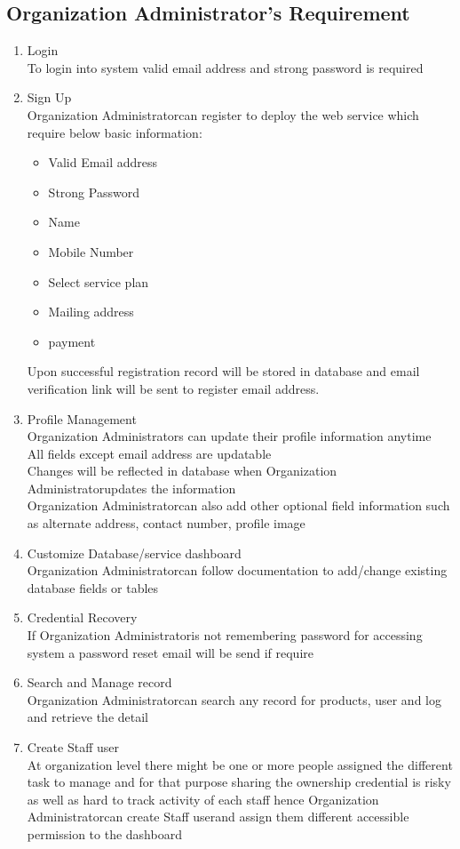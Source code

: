 \documentclass{scrreprt}
\newcommand*\arrow{\item[$\Rightarrow$]}
\def\admin{Organization Administrator}
\def\staff{Staff user}
\begin{document}
\subsection{\admin's Requirement}
\begin{enumerate}[start=1,label={\bfseries REQ \arabic*:}]
	\addtolength{\itemindent}{40pt}
	\item Login
		\\To login into system valid email address and strong password is required
	\item Sign Up
		\\ \admin \space can register to deploy the web service which require below basic information:
		\begin{itemize}
			\arrow Valid Email address
			\arrow Strong Password
			\arrow Name
			\arrow Mobile Number
			\arrow Select service plan
			\arrow Mailing address
			\arrow payment
		\end{itemize}
		Upon successful registration record will be stored in database and email verification link will be sent to register email address.
	\item Profile Management
		\\ \admin s can update their profile information anytime
		\\All fields except email address are updatable
		\\Changes will be reflected in database when \admin \space updates the information
		\\ \admin can also add other optional field information such as alternate address, contact number, profile image
	\item Customize Database/service dashboard
		\\ \admin \space can follow documentation to add/change existing database fields or tables
	\item Credential Recovery
		\\If \admin \space is not remembering password for accessing system a password reset email will be send if require 
	\item Search and Manage record
		\\ \admin \space can search any record for products, user and log and retrieve the detail 
	\item Create \staff
		\\At organization level there might be one or more people assigned the different task to manage and for that purpose sharing the ownership credential is risky as well as hard to track activity of each staff hence \admin \space can create \staff \space and assign them different accessible permission to the dashboard

\end{enumerate}
\end{document}
